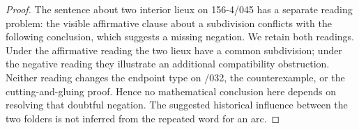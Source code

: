 \begin{proof}
The sentence about two interior lieux on 156-4/045 has a separate
reading problem: the visible affirmative clause about a subdivision
conflicts with the following conclusion, which suggests a missing
negation. We retain both readings. Under the affirmative reading
the two lieux have a common subdivision; under the negative reading
they illustrate an additional compatibility obstruction. Neither
reading changes the endpoint type on /032, the counterexample, or
the cutting-and-gluing proof. Hence no mathematical conclusion here
depends on resolving that doubtful negation. The suggested historical
influence between the two folders is not inferred from the repeated
word for an arc.
\end{proof}
